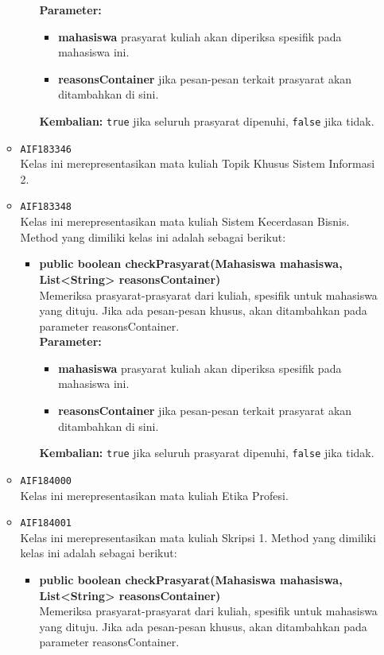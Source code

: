 \begin{enumerate}
\begin{itemize}
\begin{itemize}
\textbf{Parameter:}
\begin{itemize}
\item \textbf{mahasiswa} prasyarat kuliah akan diperiksa spesifik pada mahasiswa ini.
\item \textbf{reasonsContainer} jika pesan-pesan terkait prasyarat akan ditambahkan di sini.
\end{itemize}
\textbf{Kembalian:} \texttt{true} jika seluruh prasyarat dipenuhi, \texttt{false} jika tidak.
\end{itemize}
\item \texttt{AIF183346} \\
Kelas ini merepresentasikan mata kuliah Topik Khusus Sistem Informasi 2.
\item \texttt{AIF183348} \\
Kelas ini merepresentasikan mata kuliah Sistem Kecerdasan Bisnis. Method yang dimiliki kelas ini adalah sebagai berikut: 
\begin{itemize}
\item \textbf{public boolean checkPrasyarat(Mahasiswa mahasiswa, List<String> reasonsContainer)}\\
Memeriksa prasyarat-prasyarat dari kuliah, spesifik untuk mahasiswa yang dituju. Jika ada pesan-pesan khusus, akan ditambahkan pada parameter reasonsContainer.\\
\textbf{Parameter:}
\begin{itemize}
\item \textbf{mahasiswa} prasyarat kuliah akan diperiksa spesifik pada mahasiswa ini.
\item \textbf{reasonsContainer} jika pesan-pesan terkait prasyarat akan ditambahkan di sini.
\end{itemize}
\textbf{Kembalian:} \texttt{true} jika seluruh prasyarat dipenuhi, \texttt{false} jika tidak.
\end{itemize}
\item \texttt{AIF184000} \\
Kelas ini merepresentasikan mata kuliah Etika Profesi.
\item \texttt{AIF184001} \\
Kelas ini merepresentasikan mata kuliah Skripsi 1. Method yang dimiliki kelas ini adalah sebagai berikut: 
\begin{itemize}
\item \textbf{public boolean checkPrasyarat(Mahasiswa mahasiswa, List<String> reasonsContainer)}\\
Memeriksa prasyarat-prasyarat dari kuliah, spesifik untuk mahasiswa yang dituju. Jika ada pesan-pesan khusus, akan ditambahkan pada parameter reasonsContainer.\\

\end{itemize}
\end{itemize}
\end{enumerate}
